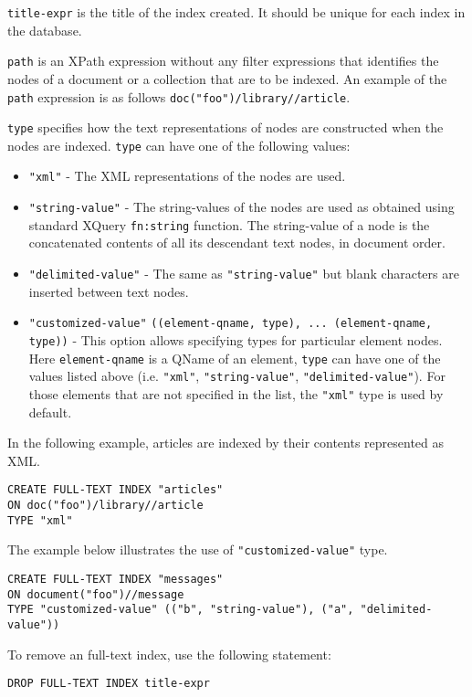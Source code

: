 \documentclass[a4paper,12pt]{article}
\begin{document}
\verb!title-expr! is the title of the index created. It should be unique for each index in the database.

\verb!path! is an XPath expression without any filter expressions that identifies the nodes of a document or a collection that are to be indexed. An example of the \verb!path! expression is as follows \verb!doc("foo")/library//article!.

\verb!type! specifies how the text representations of nodes are constructed when the nodes are indexed. \verb!type! can have one of the following values:
\begin{itemize}
\item \verb!"xml"! - The XML representations of the nodes are used.
\item \verb!"string-value"! - The string-values of the nodes are used as obtained using standard XQuery \verb!fn:string! function. The string-value of a node is the concatenated contents of all its descendant text nodes, in document order.
\item \verb!"delimited-value"! - The same as \verb!"string-value"! but blank characters are inserted between  text nodes.
\item \verb!"customized-value"! \verb!((element-qname, type), ... (element-qname, type))! - This option allows specifying  types for particular element nodes. Here \verb!element-qname! is a QName of an element, \verb!type! can have one of the values listed above (i.e. \verb!"xml"!, \verb!"string-value"!, \verb!"delimited-value"!). For those elements that are not specified in the list, the \verb!"xml"! type is used by default.
\end{itemize}

In the following example, articles are indexed by their contents represented as XML.

\begin{verbatim}
CREATE FULL-TEXT INDEX "articles"
ON doc("foo")/library//article
TYPE "xml"
\end{verbatim}

The example below illustrates the use of \verb!"customized-value"! type.
\begin{verbatim}
CREATE FULL-TEXT INDEX "messages"
ON document("foo")//message
TYPE "customized-value" (("b", "string-value"), ("a", "delimited-value"))
\end{verbatim}

To remove an full-text index, use the following statement:
\begin{verbatim}
DROP FULL-TEXT INDEX title-expr
\end{verbatim}
\end{document}
